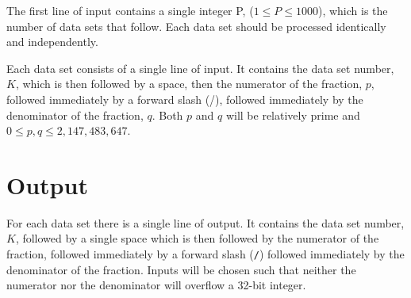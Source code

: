 The first line of input contains a single integer P, ($1 \le P \le 1000$),
which is the number of data sets that follow.  Each data set should be
processed identically and independently.

Each data set consists of a single line of input.  It contains the data
set number, $K$, which is then followed by a space, then the numerator of
the fraction, $p$, followed immediately by a forward slash (/), followed
immediately by the denominator of the fraction, $q$.  Both $p$ and $q$ will
be relatively prime and  $0 \le p, q \le 2,147,483,647$.

\section*{Output}

For each data set there is a single line of output.  It contains the
data set number, $K$, followed by a single space which is then followed
by the numerator of the fraction, followed immediately by a forward
slash (\texttt{/}) followed immediately by the denominator of the fraction.
Inputs will be chosen such that neither the numerator nor the denominator
will overflow a 32-bit integer.

